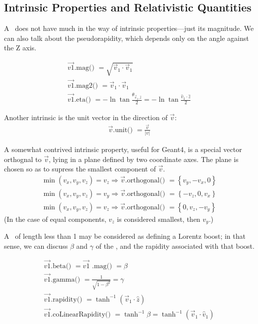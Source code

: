 \subsection{Intrinsic Properties and Relativistic Quantities}

A \SV\ does not have much in the way of intrinsic properties---just its
magnitude.
We can also talk about the pseudorapidity, which depends only on the angle
against the Z axis.

\begin{eqnarray}
  \vec{v1}\mbox{.mag() } = \sqrt { \vec{v}_{1} \cdot \vec{v}_{1} }
    \label{eq:mag} \\
  \vec{v1}\mbox{.mag2() } = \vec{v}_{1} \cdot \vec{v}_{1}
    \label{eq:mag2} \\
  \vec{v1}\mbox{.eta() } = 	-\ln \tan \frac {\theta_{\vec{v}_1,\hat{z}}}{2}
    = -\ln \tan \frac {\hat{v}_1 \cdot \hat{z}}{2}
    \label{eq:eta}
\end{eqnarray}

Another intrinsic is the unit vector in the direction of $\vec{v}$:
\begin{eqnarray}
  \vec{v}\mbox{.unit() } = \frac{\vec{v}}{|v|}
    \label{eq:svunit} 
\end{eqnarray}

A somewhat contrived intrinsic property, useful for Geant4, is a special 
vector orthognal to $\vec{v}$, lying in a plane defined by two coordinate 
axes.
The plane is chosen so as to supress the smallest component of $\vec{v}$.
\begin{eqnarray}
  \min( v_x, v_y, v_z ) = v_z \Longrightarrow 
		\vec{v}\mbox{.orthogonal() } = \left\{ v_y, -v_x, 0 \right\}
    \label{eq:orthogonal} \\
  \min( v_x, v_y, v_z ) = v_y \Longrightarrow 
		\vec{v}\mbox{.orthogonal() } = \left\{ -v_z, 0, v_x \right\}
    \nonumber \\
  \min( v_x, v_y, v_z ) = v_z \Longrightarrow 
		\vec{v}\mbox{.orthogonal() } = \left\{ 0, v_z, -v_y \right\}
    \nonumber 
\end{eqnarray}
(In the case of equal components, $v_z$ is considered smallest, then $v_y$.)


\noindent
A \SV\ of length less than 1 may be considered as defining a Lorentz boost;
in that sense, we can discuss $\beta$ and $\gamma$ of the \SV, and the rapidity
associated with that boost.

\begin{eqnarray}
  \vec{v1}\mbox{.beta() } = \vec{v1}\mbox{ .mag() } = \beta
    \label{eq:mag:2} \label{eq:beta} \\
  \vec{v1}\mbox{.gamma() } = \frac{1} {\sqrt {1-\beta^2 } } = \gamma
    \label{eq:gamma} \\
  \vec{v1}\mbox{.rapidity() } = \tanh^{-1} (\vec{v}_{1} \cdot \hat{z})
    \label{eq:rap} \\
  \vec{v1}\mbox{.coLinearRapidity() } = \tanh^{-1} \beta
    = \tanh^{-1} (\vec{v}_{1} \cdot \hat{v}_1)
    \label{eq:coLinRap}
\end{eqnarray}

